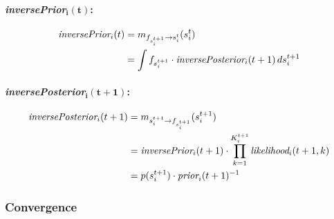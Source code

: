\documentclass[article]{jss}
\newif\ifen
\newif\ifes
\newcommand{\en}[1]{\ifen#1\fi}
\newcommand{\es}[1]{\ifes#1\fi}
\newcommand{\vm}[1]{\mathbf{#1}}
\begin{document}
 \paragraph{\emph{inversePrior}$\bm{_i(t)}$: }

 \begin{equation}
 \begin{split}
 \emph{inversePrior}_i(t) &= m_{f_{s_i^{t+1}} \rightarrow s_i^t}(s_i^t) \\
 &= \int f_{s_i^{t+1}} \cdot \emph{inversePosterior}_i(t+1) \, ds_i^{t+1}
 \end{split}
 \end{equation}

  \paragraph{\emph{inversePosterior}$\bm{_i(t+1)}$: }

 \begin{equation}
 \begin{split}
 \emph{inversePosterior}_i(t+1) &= m_{s_i^{t+1} \rightarrow f_{s_i^{t+1}}}(s_i^{t+1}) \\
 &= \emph{inversePrior}_i(t+1) \cdot \prod_{k=1}^{K_i^{t+1}} \emph{likelihood}_i(t+1,k) \\
 &= p(s_i^{t+1}) \cdot \emph{prior}_i(t+1)^{-1}
 \end{split}
 \end{equation}

\subsubsection{Convergence}

\en{\paragraph{Temporal batch} Within a temporal batch $t$, we go through the games outcomes $\vm{y}^t$ several times until convergence.}
\es{\paragraph{Bache temporal} Dentro de un bache temporal $t$, pasamos por los resultados de los juegos $\vm{y}^t$, varias veces hasta su convergencia.}
\en{The update for a game outcome $y^t_i(k)$ is performed by the same way as original TrueSkill using as prior the \emph{withinPrior}$_i(t,k)$ and saving the \emph{likelihood}$_i(t,k)$.}
\es{La actualizaci\'on para un resultado de un juego $y^t_i(k)$, se realiza de la misma manera que TrueSkill original, usando como priori el \emph{withinPrior}$_i(t,k)$ y guardando el \emph{likelihood}$_i(t,k)$.}
\end{document}

